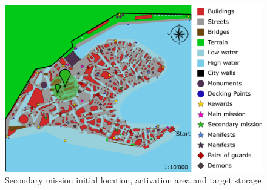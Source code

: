 \begin{figure}[H]
  \centering
  \includegraphics[width=\textwidth]{../Images/Maps/dynamiaSecondaryMissions_Guard}
  \caption{Secondary mission initial location, activation area and target storage}
\end{figure}

